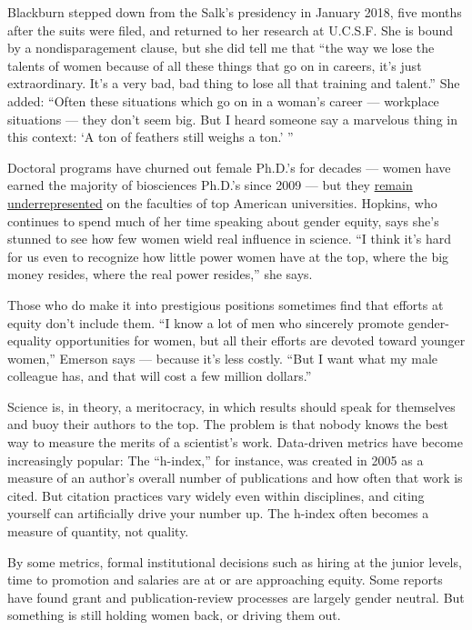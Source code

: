 Blackburn stepped down from the Salk's presidency in January 2018, five
months after the suits were filed, and returned to her research at
U.C.S.F. She is bound by a nondisparagement clause, but she did tell me
that ``the way we lose the talents of women because of all these things
that go on in careers, it's just extraordinary. It's a very bad, bad
thing to lose all that training and talent.'' She added: ``Often these
situations which go on in a woman's career --- workplace situations ---
they don't seem big. But I heard someone say a marvelous thing in this
context: `A ton of feathers still weighs a ton.' ''

Doctoral programs have churned out female Ph.D.'s for decades --- women
have earned the majority of biosciences Ph.D.'s since 2009 --- but they
\href{https://www.nature.com/news/inequality-quantified-mind-the-gender-gap-1.12550}{remain
underrepresented} on the faculties of top American universities.
Hopkins, who continues to spend much of her time speaking about gender
equity, says she's stunned to see how few women wield real influence in
science. ``I think it's hard for us even to recognize how little power
women have at the top, where the big money resides, where the real power
resides,'' she says.

Those who do make it into prestigious positions sometimes find that
efforts at equity don't include them. ``I know a lot of men who
sincerely promote gender-equality opportunities for women, but all their
efforts are devoted toward younger women,'' Emerson says --- because
it's less costly. ``But I want what my male colleague has, and that will
cost a few million dollars.''

Science is, in theory, a meritocracy, in which results should speak for
themselves and buoy their authors to the top. The problem is that nobody
knows the best way to measure the merits of a scientist's work.
Data-driven metrics have become increasingly popular: The ``h-index,''
for instance, was created in 2005 as a measure of an author's overall
number of publications and how often that work is cited. But citation
practices vary widely even within disciplines, and citing yourself can
artificially drive your number up. The h-index often becomes a measure
of quantity, not quality.

By some metrics, formal institutional decisions such as hiring at the
junior levels, time to promotion and salaries are at or are approaching
equity. Some reports have found grant and publication-review processes
are largely gender neutral. But something is still holding women back,
or driving them out.

